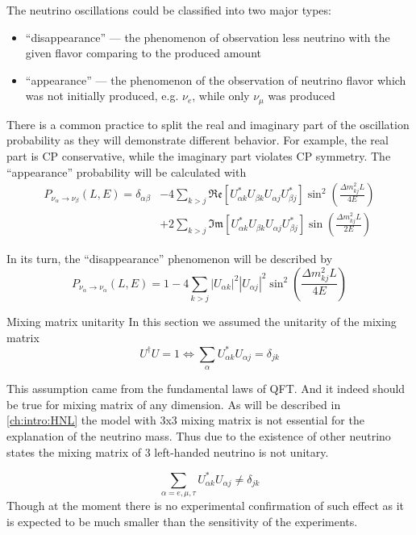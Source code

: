 \documentclass[../main.tex]{subfiles}
\begin{document}
The neutrino oscillations could be classified into two major types:
\begin{itemize}
  \item ``disappearance'' --- the phenomenon of observation less neutrino with the given flavor comparing to the produced amount
  \item ``appearance'' --- the phenomenon of the observation of neutrino flavor which was not initially produced, e.g. $\nu_e$, while  only $\nu_\mu$ was produced
\end{itemize}
There is a common practice to split the real and imaginary part of the oscillation probability as they will demonstrate different behavior. For example, the real part is CP conservative, while the imaginary part violates CP symmetry. The ``appearance'' probability will be calculated with
\begin{align}
\nonumber
P_{\nu_\alpha\to\nu_\beta}(L, E)=\delta_{\alpha\beta}&-4\sum_{k>j}\mathfrak{Re}\left[U^*_{\alpha k}U_{\beta k}U_{\alpha j}U^*_{\beta j}\right]\sin^2\left(\frac{\Delta m^2_{kj}L}{4E}\right) \\
&+2\sum_{k>j}\mathfrak{Im}\left[U^*_{\alpha k}U_{\beta k}U_{\alpha j}U^*_{\beta j}\right]\sin\left(\frac{\Delta m^2_{kj}L}{2E}\right)
\label{eq:intro:app}
\end{align}

In its turn, the ``disappearance'' phenomenon will be described by
\begin{equation}
\label{eq:intro:dis}
P_{\nu_\alpha\to\nu_\alpha}(L, E)=1-4\sum_{k>j}\left|U_{\alpha k}\right|^2\left|U_{\alpha j}\right|^2\sin^2\left(\frac{\Delta m^2_{kj}L}{4E}\right)
\end{equation}

\begin{bclogo}[couleur=blue!2, arrondi=0.1, logo=\bcinfo, nobreak=true]{Mixing matrix unitarity}
In this section we assumed the unitarity of the mixing matrix
\begin{equation}
U^\dag U=1 \Longleftrightarrow\sum_\alpha U^*_{\alpha k}U_{\alpha j}=\delta_{jk}
\end{equation}

This assumption came from the fundamental laws of QFT. And it indeed should be true for mixing matrix of any dimension. As will be described in \autoref{ch:intro:HNL} the model with 3x3 mixing matrix is not essential for the explanation of the neutrino mass. Thus due to the existence of other neutrino states the mixing matrix of 3 left-handed neutrino is not unitary.

\begin{equation}
\sum_{\alpha=e, \mu, \tau} U^*_{\alpha k}U_{\alpha j}\neq\delta_{jk}
\end{equation}
Though at the moment there is no experimental confirmation of such effect as it is expected to be much smaller than the sensitivity of the experiments.
\end{bclogo}
\end{document}
